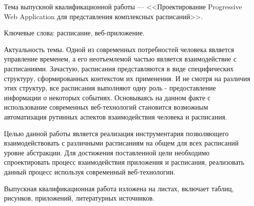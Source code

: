 
Тема выпускной квалификационной работы --- <<Проектирование Progressive Web Application для представления комплексных расписаний>>.

Ключевые слова: расписание, веб-приложение.

Актуальность темы.
Одной из современных потребностей человека является управление временем, а его неотъемлемой частью является взаимодействие с расписаниями.
Зачастую, расписания представляются в виде специфических структуру, сформированных контекстом их применения.
И не смотря на различия этих структур, все расписания выполняют одну роль - предоставление информации о некоторых событиях.
Основываясь на данном факте с использование современных веб-технологий становится возможным автоматизация рутинных аспектов взаимодействия человека и расписания.

Целью данной работы является реализация инструментария позволяющего взаимодействовать с различными расписаниям на общем для всех расписаний уровне абстракции.
Для достижения поставленной цели необходимо спроектировать процесс взаимодействия приложения и расписания, реализовать данный процесс используя современный веб-технологии.

Выпускная квалификационная работа изложена на \pageref{LastPage} листах, включает  таблиц,  рисунков,  приложений,  литературных источников.

\clearpage
